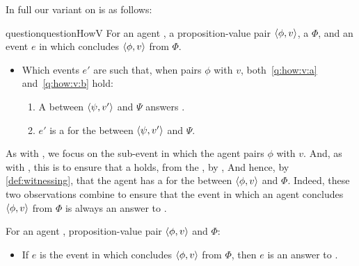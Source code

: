 \begin{note}
  In full our variant on \qHow{} is as follows:

  \begin{restatable}[\qHowV{}]{question}{questionHowV}
    \label{q:how:v}
    For an agent \vAgent{}, a proposition-value pair \(\langle \phi, v \rangle\), a \poP{} \(\Phi\), and an event \(e\) in which \vAgent{} concludes \(\langle \phi, v \rangle\) from \(\Phi\).

    \begin{itemize}
    \item
      Which events \(e'\) are such that, when \vAgent{} pairs \(\phi\) with \(v\), both~\ref{q:how:v:a} and~\ref{q:how:v:b} hold:
      \begin{enumerate}[label=\alph*., ref=(\alph*), , series=qHowVdef]
      \item
        \label{q:how:v:a}
        A \ros{} between \(\langle \psi, v' \rangle\) and \(\Psi\) answers \qWhyV{}.
      \item
        \label{q:how:v:b}
        \(e'\) is a  for the \ros{} between \(\langle \psi, v' \rangle\) and \(\Psi\).
      \end{enumerate}
    \end{itemize}
    \vspace{-\baselineskip}
  \end{restatable}

  As with \qWhyV{}, we focus on the sub-event in which the agent pairs \(\phi\) with \(v\).
  And, as with \qWhyV{}, this is to ensure that a \ros{} holds, from the \agpe{}, by \supportI{},
  And hence, by \autoref{def:witnessing}, that the agent has a \wit{} for the \ros{} between \(\langle \phi, v \rangle\) and \(\Phi\).
  Indeed, these two observations combine to ensure that the event in which an agent concludes \(\langle \phi, v \rangle\) from \(\Phi\) is always an answer to \qHowV{}.

  \begin{proposition}
    \label{prop:phi-always-how}
    For an agent \vAgent{}, proposition-value pair \(\langle \phi, v \rangle\) and \poP{} \(\Phi\):

    \begin{itemize}
    \item
      If \(e\) is the event in which \vAgent{} concludes \(\langle \phi, v \rangle\) from \(\Phi\), then \(e\) is an answer to \qHowV{}.
    \end{itemize}
    \vspace{-\baselineskip}
  \end{proposition}


\end{note}

